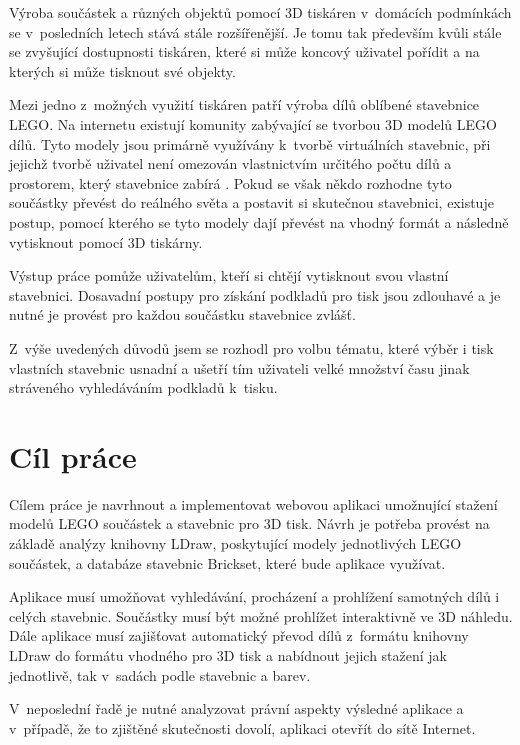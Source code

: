 \label{introduction}
Výroba součástek a různých objektů pomocí 3D tiskáren v~domácích podmínkách se v~posledních letech stává stále rozšířenější. Je tomu tak především kvůli stále se zvyšující dostupnosti tiskáren, které si může koncový uživatel pořídit a na kterých si může tisknout své objekty. 

Mezi jedno z~možných využití tiskáren patří výroba dílů oblíbené stavebnice LEGO. Na internetu existují komunity zabývající se tvorbou 3D modelů LEGO dílů. Tyto modely jsou primárně využívány k~tvorbě virtuálních stavebnic, při jejichž tvorbě uživatel není omezován vlastnictvím určitého počtu dílů a prostorem, který stavebnice zabírá \autocite{ldraw:homepage}. Pokud se však někdo rozhodne tyto součástky převést do reálného světa a postavit si skutečnou stavebnici, existuje postup, pomocí kterého se tyto modely dají převést na vhodný formát a následně vytisknout pomocí 3D tiskárny.

Výstup práce pomůže uživatelům, kteří si chtějí vytisknout svou vlastní stavebnici. Dosavadní postupy pro získání podkladů pro tisk jsou zdlouhavé a je nutné je provést pro každou součástku stavebnice zvlášť.

Z~výše uvedených důvodů jsem se rozhodl pro volbu tématu, které výběr i tisk vlastních stavebnic usnadní a ušetří tím uživateli velké množství času jinak stráveného vyhledáváním podkladů k~tisku. 

\section*{Cíl práce}
Cílem práce je navrhnout a implementovat webovou aplikaci umožnující stažení modelů LEGO součástek a stavebnic pro 3D tisk. Návrh je potřeba provést na základě analýzy knihovny LDraw, poskytující modely jednotlivých LEGO součástek, a databáze stavebnic Brickset, které bude aplikace využívat.

Aplikace musí umožňovat vyhledávání, procházení a prohlížení samotných dílů i celých stavebnic. Součástky musí být možné prohlížet interaktivně ve 3D náhledu. Dále aplikace musí zajišťovat automatický převod dílů z~formátu knihovny LDraw do formátu vhodného pro 3D tisk a nabídnout jejich stažení jak jednotlivě, tak v~sadách podle stavebnic a barev. 

V~neposlední řadě je nutné analyzovat právní aspekty výsledné aplikace a v~případě, že to zjištěné skutečnosti dovolí, aplikaci otevřít do sítě Internet.
